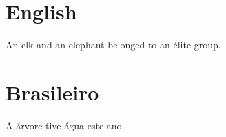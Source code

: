 \documentclass[12pt]{article}
\begin{document}
\section{English}
An \gls{elk} and an \gls{elephant} belonged to an \gls{élite} group. 

\printglossary 

\section{Brasileiro}
A \gls{árvore} tive \gls{água} este \gls{ano}. 

\printglossary[type=dictionary] 
\end{document}
